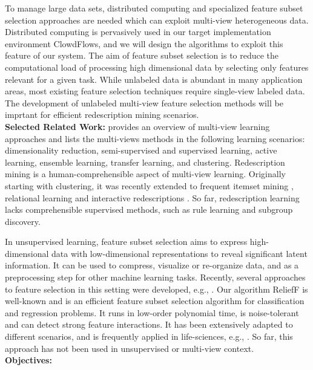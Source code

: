 \documentclass[a4paper,11pt]{article}
\begin{document}
To manage large data sets, distributed computing and specialized feature subset selection approaches are needed which can exploit multi-view heterogeneous data.
Distributed computing is pervasively used in our target implementation environment ClowdFlows, and we will design the algorithms to exploit this feature of our system. 
The aim of feature subset selection is to reduce the computational load of processing high dimensional data by selecting only features relevant for a given task. While unlabeled data is abundant in many application areas, most existing feature selection techniques require single-view labeled data. The development of unlabeled multi-view feature selection methods will be imprtant for efficient redescription mining scenarios.
\\[0,2cm]
\textbf{Selected Related Work:}
\citet{Sun2013survey} provides an overview of multi-view learning approaches and lists the multi-views methods in the following learning scenarios: dimensionality reduction, semi-supervised and supervised learning, active learning, ensemble learning, transfer learning, and clustering.
%
Redescription mining is a human-comprehensible aspect of multi-view learning. Originally starting with clustering, it was recently extended to frequent itemset mining \citet{Galbrun2012}, relational learning \citep{Galbrun2014} and interactive redescriptions \citep{Galbrun2012a}. So far, redescription learning lacks comprehensible supervised methods, such as rule learning and subgroup discovery.

In unsupervised learning, feature subset selection aims to express high-dimensional data with low-dimensional representations to reveal significant latent information. It can be used to compress, visualize or re-organize data, and as a preprocessing step for other machine learning tasks. Recently, several approaches to feature selection in this setting were developed, e.g., \citep{Yao2015,Shi2016}.
Our algorithm ReliefF \citep{Robnik03MLJ} is well-known and is an efficient feature subset selection algorithm for classification and regression problems. It runs in low-order polynomial time,  is noise-tolerant and can detect strong feature interactions. It has been extensively adapted to different scenarios, and is frequently applied in life-sciences, e.g., \citep{Xu2015,Mouelhi2015}. 
So far, this approach has not been used in unsupervised or multi-view context.
%
\\[0,2cm]
\textbf{Objectives:}
\end{document}
